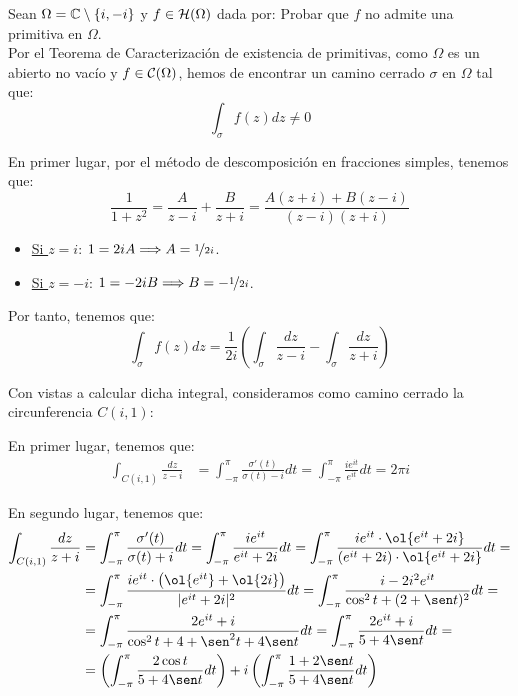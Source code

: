 \begin{ejercicio}
    Sean $\Omega = \mathbb{C}\setminus\{i,-i\}$ y $f \in \mathcal{H}(\Omega)$ dada por:
    Probar que $f$ no admite una primitiva en $\Omega$.\\

    Por el Teorema de Caracterización de existencia de primitivas, como $\Omega$ es un abierto no vacío y $f\in \mathcal{C}(\Omega)$, hemos de encontrar un camino cerrado $\sigma$ en $\Omega$ tal que:
    \begin{equation*}
        \int_{\sigma} f(z)dz \neq 0
    \end{equation*}

    En primer lugar, por el método de descomposición en fracciones simples, tenemos que:
    \begin{equation*}
        \frac{1}{1+z^2} = \frac{A}{z-i} + \frac{B}{z+i} = \frac{A(z+i)+B(z-i)}{(z-i)(z+i)}
    \end{equation*}
    \begin{itemize}
        \item \ul{Si $z=i$}: $1=2iA\Longrightarrow A=\nicefrac{1}{2i}$.
        \item \ul{Si $z=-i$}: $1=-2iB\Longrightarrow B=-\nicefrac{1}{2i}$.
    \end{itemize}

    Por tanto, tenemos que:
    \begin{equation*}
        \int_{\sigma} f(z)dz = \dfrac{1}{2i}\left(\int_{\sigma} \frac{dz}{z-i} - \int_{\sigma} \frac{dz}{z+i}\right)
    \end{equation*}

    Con vistas a calcular dicha integral, consideramos como camino cerrado la circunferencia $C(i,1)$:

    En primer lugar, tenemos que:
    \begin{align*}
        \int_{C(i,1)} \frac{dz}{z-i} &= \int_{-\pi}^{\pi} \frac{\sigma'(t)}{\sigma(t)-i}dt
        = \int_{-\pi}^{\pi} \frac{ie^{it}}{e^{it}}dt
        = 2\pi i
    \end{align*}

    En segundo lugar, tenemos que:
    \begin{align*}
        \int_{C(i,1)} \frac{dz}{z+i} &= \int_{-\pi}^{\pi} \frac{\sigma'(t)}{\sigma(t)+i}dt
        = \int_{-\pi}^{\pi} \frac{ie^{it}}{e^{it}+2i}dt
        = \int_{-\pi}^{\pi} \frac{ie^{it}\cdot \ol{e^{it}+2i}}{(e^{it}+2i)\cdot \ol{e^{it}+2i}}dt
        =\\&= \int_{-\pi}^{\pi} \frac{ie^{it}\cdot \left(\ol{e^{it}}+\ol{2i}\right)}{|e^{it}+2i|^2}dt
        = \int_{-\pi}^{\pi} \frac{i-2i^2e^{it}}{{\cos^2t + (2+\sen t)^2}}dt
        =\\&= \int_{-\pi}^{\pi} \frac{2e^{it}+i}{{\cos^2t + 4+\sen^2t+4\sen t}}dt
        = \int_{-\pi}^{\pi} \frac{2e^{it}+i}{{5+4\sen t}}dt
        =\\&= \left(\int_{-\pi}^{\pi} \frac{2\cos t}{{5+4\sen t}}dt\right) + i\left(\int_{-\pi}^{\pi} \frac{1+2\sen t}{{5+4\sen t}}dt\right)
    \end{align*}


\end{ejercicio}
